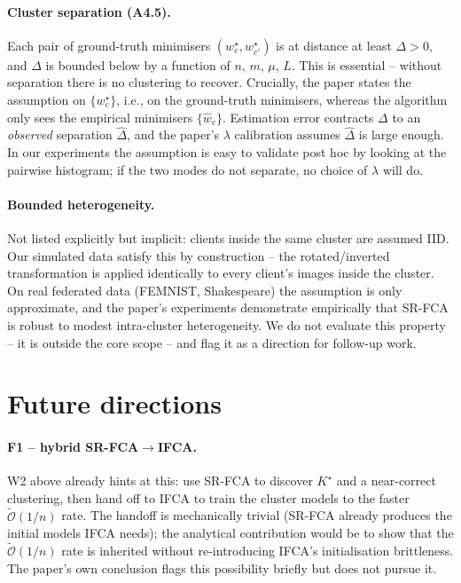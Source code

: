 \paragraph{Cluster separation (A4.5).} Each pair of ground-truth minimisers $(w^\star_c, w^\star_{c'})$ is at distance at least $\Delta > 0$, and $\Delta$ is bounded below by a function of $n$, $m$, $\mu$, $L$. This is essential -- without separation there is no clustering to recover. Crucially, the paper states the assumption on $\{w^\star_c\}$, i.e., on the ground-truth minimisers, whereas the algorithm only sees the empirical minimisers $\{\hat{w}_c\}$. Estimation error contracts $\Delta$ to an \emph{observed} separation $\hat{\Delta}$, and the paper's $\lambda$ calibration assumes $\hat{\Delta}$ is large enough. In our experiments the assumption is easy to validate post hoc by looking at the pairwise histogram; if the two modes do not separate, no choice of $\lambda$ will do.

\paragraph{Bounded heterogeneity.} Not listed explicitly but implicit: clients inside the same cluster are assumed IID. Our simulated data satisfy this by construction -- the rotated/inverted transformation is applied identically to every client's images inside the cluster. On real federated data (FEMNIST, Shakespeare) the assumption is only approximate, and the paper's experiments demonstrate empirically that SR-FCA is robust to modest intra-cluster heterogeneity. We do not evaluate this property -- it is outside the core scope -- and flag it as a direction for follow-up work.

\section{Future directions}\label{sec:future}

\paragraph{F1 -- hybrid SR-FCA$\to$IFCA.} W2 above already hints at this: use SR-FCA to discover $K^\star$ and a near-correct clustering, then hand off to IFCA to train the cluster models to the faster $\tilde{\mathcal{O}}(1/n)$ rate. The handoff is mechanically trivial (SR-FCA already produces the initial models IFCA needs); the analytical contribution would be to show that the $\tilde{\mathcal{O}}(1/n)$ rate is inherited without re-introducing IFCA's initialisation brittleness. The paper's own conclusion flags this possibility briefly but does not pursue it.

